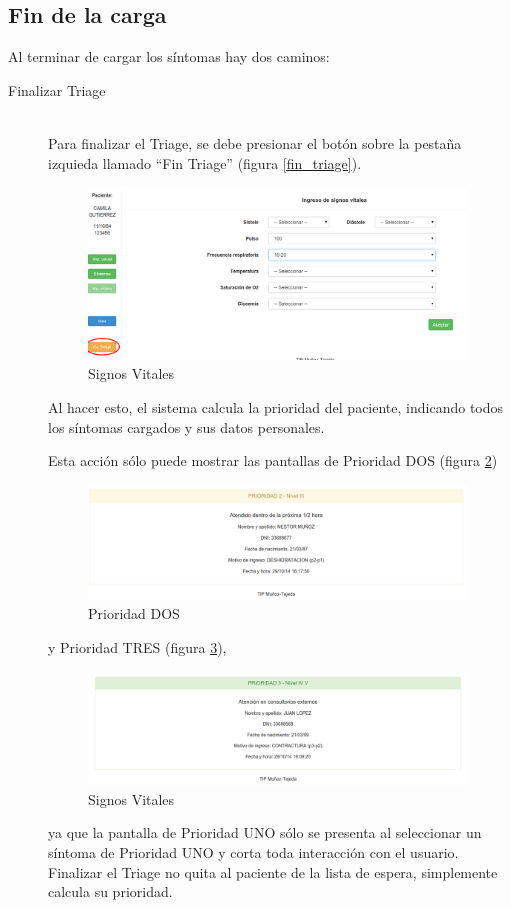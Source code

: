 \subsection{Fin de la carga}
Al terminar de cargar los síntomas hay dos caminos:
\begin{description}
\item[Finalizar Triage]  \mbox{} \\
Para finalizar el Triage, se debe presionar el botón sobre la pestaña izquieda llamado ``Fin Triage'' (figura \ref{fin_triage}).
\begin{figure}
\centerline{\includegraphics[width=0.99\textwidth]{fin_triage.png}}
\caption{Signos Vitales} \label{fig:fin_triage}
\end{figure}
 Al hacer esto, el sistema calcula la prioridad del paciente, indicando todos los síntomas cargados y sus datos personales. 

Esta acción sólo puede mostrar las pantallas de Prioridad DOS (figura \ref{fig:prioridad_dos}) 
\begin{figure}
\centerline{\includegraphics[width=0.99\textwidth]{prioridad_dos.png}}
\caption{Prioridad DOS} \label{fig:prioridad_dos}
\end{figure}
y Prioridad TRES (figura \ref{fig:prioridad_tres}), 
\begin{figure}
\centerline{\includegraphics[width=0.99\textwidth]{prioridad_tres.png}}
\caption{Signos Vitales} \label{fig:prioridad_tres}
\end{figure}
ya que la pantalla de Prioridad UNO sólo se presenta al seleccionar un síntoma de Prioridad UNO y corta toda interacción con el usuario.
Finalizar el Triage no quita al paciente de la lista de espera, simplemente calcula su prioridad. 


\end{description}
